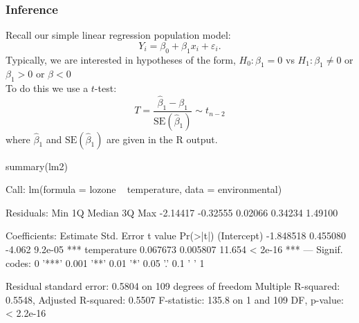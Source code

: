 \documentclass[a4paper]{article}\usepackage[]{graphicx}\usepackage[]{xcolor}
\begin{document}
\subsubsection{Inference}
Recall our simple linear regression population model:
\[
	Y_i = \beta_0 + \beta_1 x_i + \varepsilon_i.
\]
Typically, we are interested in hypotheses of the form, \( H_0: \beta_1 = 0 \) vs \( H_1: \beta_1 \neq 0 \) or \( \beta_1 > 0 \) or \( \beta < 0 \)\\
To do this we use a \( t \)-test:
\[
	T = \frac{\hat{\beta}_1 - \beta_1}{\text{SE}(\hat{\beta}_1)} \sim t_{n-2}
\]
where \( \hat{\beta}_1 \) and \( \text{SE}(\hat{\beta}_1) \) are given in the R output.
\begin{Schunk}
\begin{Sinput}
summary(lm2)
\end{Sinput}
\begin{Soutput}

Call:
lm(formula = lozone ~ temperature, data = environmental)

Residuals:
     Min       1Q   Median       3Q      Max 
-2.14417 -0.32555  0.02066  0.34234  1.49100 

Coefficients:
             Estimate Std. Error t value Pr(>|t|)    
(Intercept) -1.848518   0.455080  -4.062  9.2e-05 ***
temperature  0.067673   0.005807  11.654  < 2e-16 ***
---
Signif. codes:  0 '***' 0.001 '**' 0.01 '*' 0.05 '.' 0.1 ' ' 1

Residual standard error: 0.5804 on 109 degrees of freedom
Multiple R-squared:  0.5548,	Adjusted R-squared:  0.5507 
F-statistic: 135.8 on 1 and 109 DF,  p-value: < 2.2e-16
\end{Soutput}
\end{Schunk}
\end{document}

